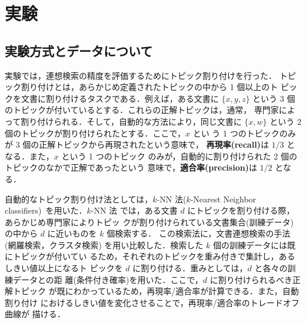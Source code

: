 \section{実験}
\label{sec:experiment}

\subsection{実験方式とデータについて}

実験では，連想検索の精度を評価するために{\gt トピック割り付け}を行った．
トピック割り付けとは，あらかじめ定義されたトピックの中から 1 個以上のト
ピックを文書に割り付けるタスクである．例えば，ある文書に $\{x, y, z\}$ 
という 3 個のトピックが付いているとする．これらの正解トピックは，通常，
専門家によって割り付けられる．そして，自動的な方法により，同じ文書に 
$\{x, w\}$ という 2 個のトピックが割り付けられたとする．ここで，$x$ とい
う 1 つのトピックのみが 3 個の正解トピックから再現されたという意味で，
{\gt\bf 再現率(recall)}は $1/3$ となる．また，$x$ という 1 つのトピック
のみが，自動的に割り付けられた 2 個のトピックのなかで正解であったという
意味で，{\gt\bf 適合率(precision)}は $1/2$ となる．

自動的なトピック割り付け法としては，$k$-NN 法($k$-Nearest Neighbor
classifiers)~\cite{weiss:90:a,masand:92:a,mouri/97/a}を用いた．$k$-NN 法
では，ある文書 $d$ にトピックを割り付ける際，あらかじめ専門家によりトピッ
クが割り付けられている文書集合(訓練データ)の中から $d$ に近いものを $k$ 
個検索する． この検索法に，文書連想検索の手法(網羅検索，クラスタ検索)
を用い比較した．検索した $k$ 個の訓練データには既にトピックが付いてい
るため，それぞれのトピックを重み付きで集計し，あるしきい値以上になるト
ピックを $d$ に割り付ける．重みとしては，$d$ と各々の訓練データとの距
離(条件付き確率)を用いた．ここで，$d$ に割り付けられるべき正解トピック
が既にわかっているため，再現率/適合率が計算できる．また，自動割り付け
におけるしきい値を変化させることで，再現率/適合率のトレードオフ曲線が
描ける．

